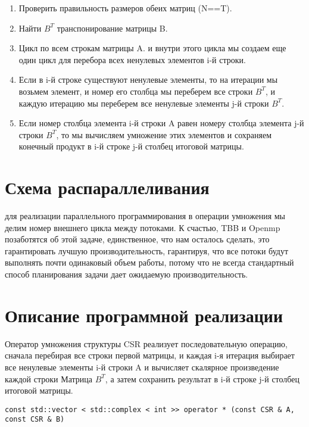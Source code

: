 \documentclass{report}
\begin{document}
\begin{enumerate}
\begin{enumerate}
\item Проверить правильность размеров обеих матриц (N==T).
\item Найти $B^{T}$ транспонирование матрицы B.
\item Цикл по всем строкам матрицы A. и внутри этого цикла мы создаем еще один цикл для перебора всех ненулевых элементов i-й строки.
\item Если в i-й строке существуют ненулевые элементы, то на итерации мы возьмем элемент, и номер его столбца мы переберем все строки $B^{T}$, и каждую итерацию мы переберем все ненулевые элементы j-й строки $B^{T}$.
\item Если номер столбца элемента i-й строки A равен номеру столбца элемента j-й строки $B^{T}$, то мы вычисляем умножение этих элементов и сохраняем конечный продукт в i-й строке j-й столбец итоговой матрицы.
\end{enumerate}
\end{enumerate}

\section*{Схема распараллеливания}
\par для реализации параллельного программирования в операции умножения мы делим номер внешнего цикла между потоками. К счастью, TBB и Openmp позаботятся об этой задаче, единственное, что нам осталось сделать, это гарантировать лучшую производительность, гарантируя, что все потоки будут выполнять почти одинаковый объем работы, потому что не всегда стандартный способ планирования задачи дает ожидаемую производительность.
\newpage

\section*{Описание программной реализации}
\par Оператор умножения структуры CSR реализует последовательную операцию, сначала перебирая все строки первой матрицы, и каждая i-я итерация выбирает все ненулевые элементы i-й строки A и вычисляет скалярное произведение каждой строки Матрица $B^{T}$, а затем сохранить результат в i-й строке j-й столбец итоговой матрицы.
\begin{lstlisting}
const std::vector < std::complex < int >> operator * (const CSR & A, const CSR & B)
\end{lstlisting}
\end{document}
